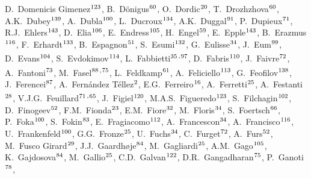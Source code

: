 \begin{flushleft}
D.~Domenicis Gimenez$^\textrm{\scriptsize 123}$,
B.~D\"{o}nigus$^\textrm{\scriptsize 60}$,
O.~Dordic$^\textrm{\scriptsize 20}$,
T.~Drozhzhova$^\textrm{\scriptsize 60}$,
A.K.~Dubey$^\textrm{\scriptsize 139}$,
A.~Dubla$^\textrm{\scriptsize 100}$,
L.~Ducroux$^\textrm{\scriptsize 134}$,
A.K.~Duggal$^\textrm{\scriptsize 91}$,
P.~Dupieux$^\textrm{\scriptsize 71}$,
R.J.~Ehlers$^\textrm{\scriptsize 143}$,
D.~Elia$^\textrm{\scriptsize 106}$,
E.~Endress$^\textrm{\scriptsize 105}$,
H.~Engel$^\textrm{\scriptsize 59}$,
E.~Epple$^\textrm{\scriptsize 143}$,
B.~Erazmus$^\textrm{\scriptsize 116}$,
F.~Erhardt$^\textrm{\scriptsize 133}$,
B.~Espagnon$^\textrm{\scriptsize 51}$,
S.~Esumi$^\textrm{\scriptsize 132}$,
G.~Eulisse$^\textrm{\scriptsize 34}$,
J.~Eum$^\textrm{\scriptsize 99}$,
D.~Evans$^\textrm{\scriptsize 104}$,
S.~Evdokimov$^\textrm{\scriptsize 114}$,
L.~Fabbietti$^\textrm{\scriptsize 35}$\textsuperscript{,}$^\textrm{\scriptsize 97}$,
D.~Fabris$^\textrm{\scriptsize 110}$,
J.~Faivre$^\textrm{\scriptsize 72}$,
A.~Fantoni$^\textrm{\scriptsize 73}$,
M.~Fasel$^\textrm{\scriptsize 88}$\textsuperscript{,}$^\textrm{\scriptsize 75}$,
L.~Feldkamp$^\textrm{\scriptsize 61}$,
A.~Feliciello$^\textrm{\scriptsize 113}$,
G.~Feofilov$^\textrm{\scriptsize 138}$,
J.~Ferencei$^\textrm{\scriptsize 87}$,
A.~Fern\'{a}ndez T\'{e}llez$^\textrm{\scriptsize 2}$,
E.G.~Ferreiro$^\textrm{\scriptsize 16}$,
A.~Ferretti$^\textrm{\scriptsize 25}$,
A.~Festanti$^\textrm{\scriptsize 28}$,
V.J.G.~Feuillard$^\textrm{\scriptsize 71}$\textsuperscript{,}$^\textrm{\scriptsize 65}$,
J.~Figiel$^\textrm{\scriptsize 120}$,
M.A.S.~Figueredo$^\textrm{\scriptsize 123}$,
S.~Filchagin$^\textrm{\scriptsize 102}$,
D.~Finogeev$^\textrm{\scriptsize 52}$,
F.M.~Fionda$^\textrm{\scriptsize 23}$,
E.M.~Fiore$^\textrm{\scriptsize 32}$,
M.~Floris$^\textrm{\scriptsize 34}$,
S.~Foertsch$^\textrm{\scriptsize 66}$,
P.~Foka$^\textrm{\scriptsize 100}$,
S.~Fokin$^\textrm{\scriptsize 83}$,
E.~Fragiacomo$^\textrm{\scriptsize 112}$,
A.~Francescon$^\textrm{\scriptsize 34}$,
A.~Francisco$^\textrm{\scriptsize 116}$,
U.~Frankenfeld$^\textrm{\scriptsize 100}$,
G.G.~Fronze$^\textrm{\scriptsize 25}$,
U.~Fuchs$^\textrm{\scriptsize 34}$,
C.~Furget$^\textrm{\scriptsize 72}$,
A.~Furs$^\textrm{\scriptsize 52}$,
M.~Fusco Girard$^\textrm{\scriptsize 29}$,
J.J.~Gaardh{\o}je$^\textrm{\scriptsize 84}$,
M.~Gagliardi$^\textrm{\scriptsize 25}$,
A.M.~Gago$^\textrm{\scriptsize 105}$,
K.~Gajdosova$^\textrm{\scriptsize 84}$,
M.~Gallio$^\textrm{\scriptsize 25}$,
C.D.~Galvan$^\textrm{\scriptsize 122}$,
D.R.~Gangadharan$^\textrm{\scriptsize 75}$,
P.~Ganoti$^\textrm{\scriptsize 78}$,

\end{flushleft}
